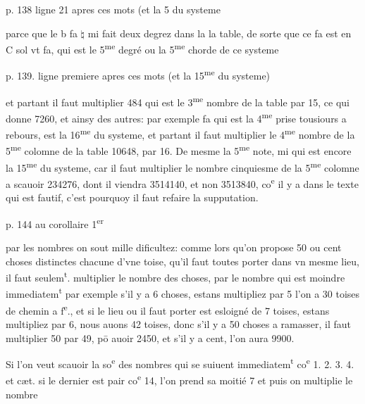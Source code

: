 \documentclass[11pt,a4paper]{article}
\begin{document}
p. 138 ligne 21 apres ces mots (et la 5 du systeme

parce que le b fa $\natural$ mi fait deux degrez dans la la table, de sorte que ce fa est en C sol vt fa, qui est le 5\textsuperscript{me} degré ou la 5\textsuperscript{me} chorde de ce systeme

p. 139. ligne premiere apres ces mots (et la 15\textsuperscript{me} du systeme)

et partant il faut multiplier 484 qui est le 3\textsuperscript{me} nombre de la table par 15, ce qui donne 7260, et ainsy des autres: par exemple fa qui est la 4\textsuperscript{me} prise tousiours a rebours, est la 16\textsuperscript{me} du systeme, et partant il faut multiplier le 4\textsuperscript{me} nombre de la 5\textsuperscript{me} colomne de la table 10648, par 16. De mesme la 5\textsuperscript{me} note, mi qui est encore la 15\textsuperscript{me} du systeme, car il faut multiplier le nombre cinquiesme de la 5\textsuperscript{me} colomne a scauoir 234276,  dont il viendra 3514140, et non 3513840, co\textsuperscript{e} il y a dans le texte qui est fautif, c'est pourquoy il faut refaire la supputation.

p. 144 au corollaire 1\textsuperscript{er}

 par les nombres on sout mille dificultez: comme lors qu'on propose 50 ou cent choses distinctes chacune d'vne toise, qu'il faut toutes porter dans vn mesme lieu, il faut seulem\textsuperscript{t}. multiplier le nombre des choses, par le nombre qui est moindre immediatem\textsuperscript{t} par exemple s'il y a 6 choses, estans multipliez par 5 l'on a 30 toises de chemin a f\textsuperscript{e}., et si le lieu ou il faut porter est esloigné de 7 toises, estans multipliez par 6, nous auons 42 toises, donc s'il y a 50 choses a ramasser, il faut multiplier 50 par 49, pō auoir 2450, et s'il y a cent, l'on aura 9900.

 Si l'on veut scauoir la so\textsuperscript{e} des nombres qui se suiuent immediatem\textsuperscript{t} co\textsuperscript{e} 1. 2. 3. 4. et cæt. si le dernier est pair co\textsuperscript{e} 14, l'on prend sa moitié 7 et puis on multiplie le nombre
\end{document}
